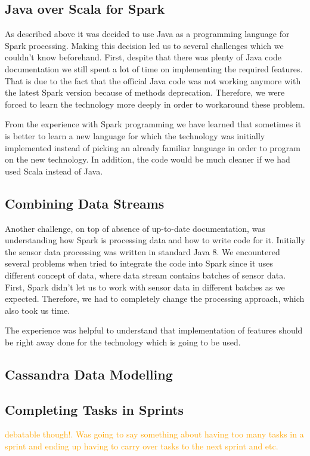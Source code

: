 \documentclass[prodmode,acmtosem]{acmsmall} %
\begin{document}
\subsection{Java over Scala for Spark}
As described above it was decided to use Java as a programming language for Spark processing. Making this decision led us to several challenges which we couldn't know beforehand. First, despite that there was plenty of Java code documentation we still spent a lot of time on implementing the required features. That is due to the fact that the official Java code was not working anymore with the latest Spark version because of methods deprecation. Therefore, we were forced to learn the technology more deeply in order to workaround these problem. 

From the experience with Spark programming we have learned that sometimes it is better to learn a new language for which the technology was initially implemented instead of picking an already familiar language in order to program on the new technology. In addition, the code would be much cleaner if we had used Scala instead of Java.

\subsection{Combining Data Streams}
Another challenge, on top of absence of up-to-date documentation, was understanding how Spark is processing data and how to write code for it. Initially the sensor data processing was written in standard Java 8. We encountered several problems when tried to integrate the code into Spark since it uses different concept of data, where data stream contains batches of sensor data. First, Spark didn't let us to work with sensor data in different batches as we expected. Therefore, we had to completely change the processing approach, which also took us time.

The experience was helpful to understand that implementation of features should be right away done for the technology which is going to be used.

\subsection{Cassandra Data Modelling}

\subsection{Completing Tasks in Sprints}\textcolor{orange}{debatable though!. Was going to say something about having too many tasks in a sprint and ending up having to carry over tasks to the next sprint and etc.}
\end{document}

